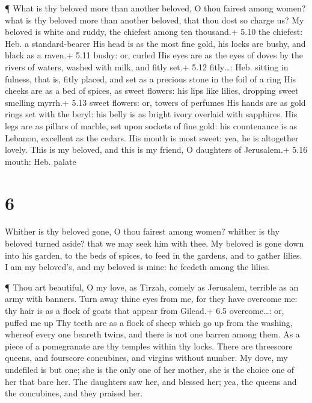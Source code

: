  ¶ What is thy beloved more than another beloved, O thou
fairest among women? what is thy beloved more than another beloved, that
thou dost so charge us?  My beloved is white and ruddy, the
chiefest among ten thousand.+ 5.10 the chiefest: Heb. a standard-bearer
 His head is as the most fine gold, his locks are bushy,
and black as a raven.+ 5.11 bushy: or, curled  His eyes are
as the eyes of doves by the rivers of waters, washed with milk, and
fitly set.+ 5.12 fitly\ldots: Heb. sitting in fulness, that is, fitly
placed, and set as a precious stone in the foil of a ring 
His cheeks are as a bed of spices, as sweet flowers: his lips like
lilies, dropping sweet smelling myrrh.+ 5.13 sweet flowers: or, towers
of perfumes  His hands are as gold rings set with the
beryl: his belly is as bright ivory overlaid with sapphires.
 His legs are as pillars of marble, set upon sockets of
fine gold: his countenance is as Lebanon, excellent as the cedars.
 His mouth is most sweet: yea, he is altogether lovely.
This is my beloved, and this is my friend, O daughters of Jerusalem.+
5.16 mouth: Heb. palate

\hypertarget{section-5}{%
\section{6}\label{section-5}}

 Whither is thy beloved gone, O thou fairest among women?
whither is thy beloved turned aside? that we may seek him with thee.
 My beloved is gone down into his garden, to the beds of
spices, to feed in the gardens, and to gather lilies.  I am
my beloved's, and my beloved is mine: he feedeth among the lilies.

 ¶ Thou art beautiful, O my love, as Tirzah, comely as
Jerusalem, terrible as an army with banners.  Turn away
thine eyes from me, for they have overcome me: thy hair is as a flock of
goats that appear from Gilead.+ 6.5 overcome\ldots: or, puffed me up
 Thy teeth are as a flock of sheep which go up from the
washing, whereof every one beareth twins, and there is not one barren
among them.  As a piece of a pomegranate are thy temples
within thy locks.  There are threescore queens, and
fourscore concubines, and virgins without number.  My dove,
my undefiled is but one; she is the only one of her mother, she is the
choice one of her that bare her. The daughters saw her, and blessed her;
yea, the queens and the concubines, and they praised her.

